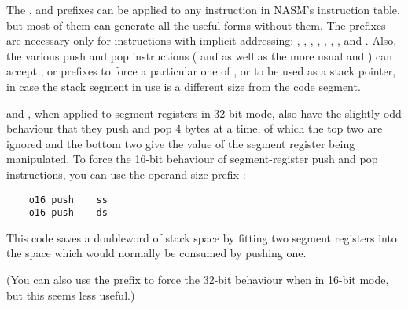 The ,  and  prefixes can be applied to
any instruction in NASM's instruction table, but most of them can
generate all the useful forms without them. The prefixes are necessary
only for instructions with implicit addressing: ,
, , , , ,
, and . Also, the various push and pop
instructions ( and  as well as the more usual
 and ) can accept ,  or
 prefixes to force a particular one of ,  or
 to be used as a stack pointer, in case the stack segment in
use is a different size from the code segment.

 and , when applied to segment registers in 32-bit
mode, also have the slightly odd behaviour that they push and pop 4
bytes at a time, of which the top two are ignored and the bottom two
give the value of the segment register being manipulated. To force
the 16-bit behaviour of segment-register push and pop instructions,
you can use the operand-size prefix :

\begin{lstlisting}
    o16 push    ss
    o16 push    ds
\end{lstlisting}

This code saves a doubleword of stack space by fitting two segment
registers into the space which would normally be consumed by pushing
one.

(You can also use the  prefix to force the 32-bit behaviour
when in 16-bit mode, but this seems less useful.)
